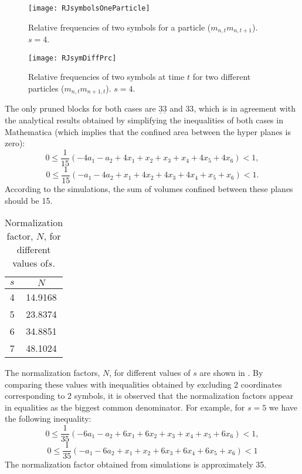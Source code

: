 \begin{figure}
	\texttt{[image: RJsymbolsOneParticle]}
	\caption{\label{RJsymbolsOneParticle}
Relative frequencies of two symbols for a particle ($m_{n,t} m_{n,t+1}$). $s = 4$.
            }
\end{figure}

\begin{figure}

	\texttt{[image: RJsymDiffPrc]}
	\caption{\label{RJsymDiffPrc}
Relative frequencies of two symbols at time $t$ for two different
particles ($m_{n,t} m_{n+1,t}$). $s = 4$.
            }	
\end{figure}

The only pruned blocks for both cases are $ \underline{3}\underline{3} $ and $ 33 $, which is in agreement with the analytical results obtained by simplifying the  inequalities of both cases in Mathematica (which implies that the confined area between the hyper planes is zero):
$$ 0 \leq \frac{1}{15} \left(-4 a_1-a_2+4 x_1+x_2+x_3+x_4+4 x_5+4 x_6\right) < 1,$$
$$ 0 \leq \frac{1}{15} \left(-a_1-4 a_2+x_1+4 x_2+4 x_3+4 x_4+x_5+x_6\right) <1. $$
According to the simulations, the sum of volumes confined between these planes should be 15.

\begin{table}
\begin{center}
\begin{tabular}{ |c|c|}
 \hline
 $s$ & $N$\\
 \hline
 4 & 14.9168\\
 \hline
5 & 23.8374\\
\hline
 6 & 34.8851\\
 \hline
 7 & 48.1024\\
 \hline
 \end{tabular}
\end{center}
 \caption{\label{TwoSymbolsNormalization}
 Normalization factor, $N$, for different values of$s$.
        }
 \end{table}

The  normalization factors, $N$, for different values of $s$ are shown in
. By comparing these values with
inequalities obtained by excluding 2 coordinates corresponding to 2
symbols, it is observed that the normalization factors appear in
equalities as the biggest common denominator. For example, for $s=5$
we have the following inequality:
$$0 \leq \frac{1}{35} \left(-6 a_1-a_2+6 x_1+6 x_2+x_3+x_4+x_5+6 x_6\right) < 1,$$
$$0 \leq \frac{1}{35} \left(-a_1-6 a_2+x_1+x_2+6 x_3+6 x_4+6 x_5+x_6\right) < 1$$
The normalization factor obtained from simulations is approximately 35.


